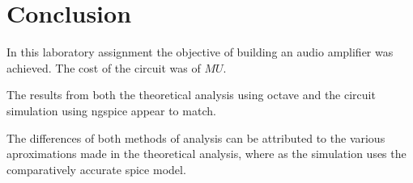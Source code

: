 \section{Conclusion}
\label{sec:conclusion}

In this laboratory assignment the objective of building an audio amplifier was achieved.
 The cost of the circuit was of $ MU$.
 
The results from both the theoretical analysis using octave and the circuit
simulation using ngspice appear to match.

The differences of both methods of analysis can be attributed to the various aproximations
made in the theoretical analysis, where as the simulation uses the comparatively accurate spice model.
